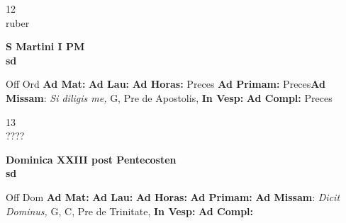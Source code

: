 \documentclass[10pt, openany]{book}
\begin{document}
    \begin{center}
        \begin{minipage}{3.5in}
            \vspace{2em}
            \begin{minipage}{0.5in}
                {\Huge 12} \\
                {\normalsize ruber}
            \end{minipage}
            \begin{minipage}{3.0in}
                \textbf{ \large S Martini I PM \\
                \textnormal{\normalsize sd}}

            \end{minipage}
            \begin{justify}Off Ord
                \textbf{Ad Mat: }
                \textbf{Ad Lau: }
                \textbf{Ad Horas: }Preces
                \textbf{Ad Primam: }Preces\textbf{Ad Missam}: \textit{Si diligis me,} G, Pre de Apostolis, 
                \textbf{In Vesp: }
                \textbf{Ad Compl: }Preces
            \end{justify}
        \end{minipage}
    \end{center}

    \begin{center}
        \begin{minipage}{3.5in}
            \vspace{2em}
            \begin{minipage}{0.5in}
                {\Huge 13} \\
                {\normalsize ????}
            \end{minipage}
            \begin{minipage}{3.0in}
                \textbf{ \large Dominica XXIII post Pentecosten \\
                \textnormal{\normalsize sd}}

            \end{minipage}
            \begin{justify}Off Dom
                \textbf{Ad Mat: }
                \textbf{Ad Lau: }
                \textbf{Ad Horas: }
                \textbf{Ad Primam: }\textbf{Ad Missam}: \textit{Dicit Dominus,} G, C, Pre de Trinitate, 
                \textbf{In Vesp: }
                \textbf{Ad Compl: }
            \end{justify}
        \end{minipage}
    \end{center}
\end{document}

